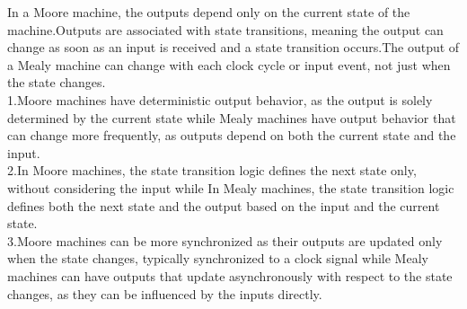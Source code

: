 \documentclass[a4paper]{article}
\begin{document}
\begin{answer}[Question 3]
    In a Moore machine, the outputs depend only on the current state of the machine.Outputs are associated with state transitions, meaning the output can change as soon as an input is received and a state transition occurs.The output of a Mealy machine can change with each clock cycle or input event, not just when the state changes.\\
    1.Moore machines have deterministic output behavior, as the output is solely determined by the current state while Mealy machines have output behavior that can change more frequently, as outputs depend on both the current state and the input.\\
    2.In Moore machines, the state transition logic defines the next state only, without considering the input while In Mealy machines, the state transition logic defines both the next state and the output based on the input and the current state.\\
    3.Moore machines can be more synchronized as their outputs are updated only when the state changes, typically synchronized to a clock signal while Mealy machines can have outputs that update asynchronously with respect to the state changes, as they can be influenced by the inputs directly.\\
\end{answer}
\end{document}
